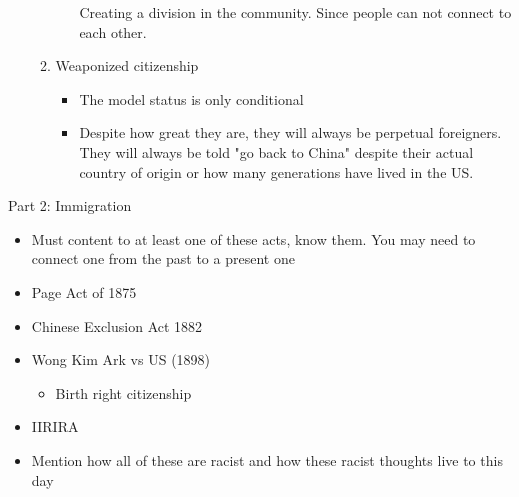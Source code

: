 \documentclass{article}
\begin{document}
\begin{itemize}
\begin{enumerate}
\begin{itemize}
            Creating a division in the community. Since people
            can not connect to each other.
        \end{itemize}
      \item Weaponized citizenship
        \begin{itemize}
          \item The model status is only conditional
          \item Despite how great they are,
            they will always be perpetual foreigners.
            They will always be told "go back to China"
            despite their actual country of origin or how many
            generations have lived in the US.
        \end{itemize}
    \end{enumerate}
\end{itemize}

Part 2: Immigration
\begin{itemize}
  \item Must content to at least one of these acts,
    know them. You may need to connect one from the past to
    a present one
  \item Page Act of 1875
  \item Chinese Exclusion Act 1882
  \item Wong Kim Ark vs US (1898)
    \begin{itemize}
      \item Birth right citizenship
    \end{itemize}

  \item IIRIRA
  \item Mention how all of these are racist and how these
    racist thoughts live to this day
\end{itemize}
\end{document}
